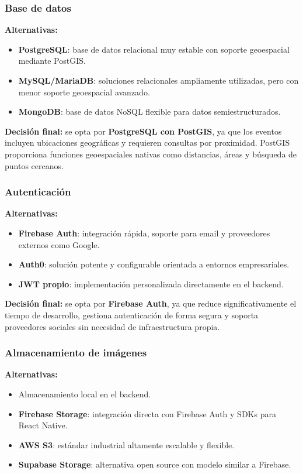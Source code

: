 \documentclass[12pt]{article}
\begin{document}
\subsubsection{Base de datos}
\textbf{Alternativas:}
\begin{itemize}
    \item \textbf{PostgreSQL}: base de datos relacional muy estable con soporte geoespacial mediante PostGIS.
    \item \textbf{MySQL/MariaDB}: soluciones relacionales ampliamente utilizadas, pero con menor soporte geoespacial avanzado.
    \item \textbf{MongoDB}: base de datos NoSQL flexible para datos semiestructurados.
\end{itemize}

\textbf{Decisión final:} se opta por \textbf{PostgreSQL con PostGIS}, ya que los eventos incluyen ubicaciones geográficas y requieren consultas por proximidad. PostGIS proporciona funciones geoespaciales nativas como distancias, áreas y búsqueda de puntos cercanos.

\subsubsection{Autenticación}
\textbf{Alternativas:}
\begin{itemize}
    \item \textbf{Firebase Auth}: integración rápida, soporte para email y proveedores externos como Google.
    \item \textbf{Auth0}: solución potente y configurable orientada a entornos empresariales.
    \item \textbf{JWT propio}: implementación personalizada directamente en el backend.
\end{itemize}

\textbf{Decisión final:} se opta por \textbf{Firebase Auth}, ya que reduce significativamente el tiempo de desarrollo, gestiona autenticación de forma segura y soporta proveedores sociales sin necesidad de infraestructura propia.

\subsubsection{Almacenamiento de imágenes}
\textbf{Alternativas:}
\begin{itemize}
    \item Almacenamiento local en el backend.
    \item \textbf{Firebase Storage}: integración directa con Firebase Auth y SDKs para React Native.
    \item \textbf{AWS S3}: estándar industrial altamente escalable y flexible.
    \item \textbf{Supabase Storage}: alternativa open source con modelo similar a Firebase.
\end{itemize}
\end{document}
